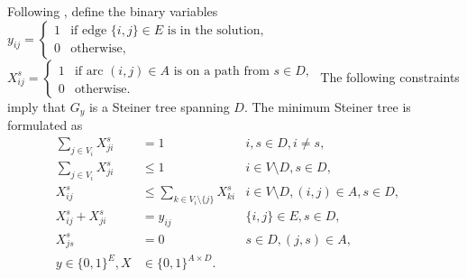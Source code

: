 Following \cite{Haugland12Dual}, define the binary variables
\newline\newline
$y_{ij}=
\begin{cases}
    1 & \text{if edge $\{i,j\} \in E$ is in the solution},\\
    0 & \text{otherwise},
  \end{cases}$
\newline\newline
$X^{s}_{ij}=
\begin{cases}
    1 & \text{if arc $(i,j) \in A$ is on a path from $s\in D$},\\
    0 & \text{otherwise}.
  \end{cases}$
\newline\newline
The following constraints imply that $G_y$ is a Steiner tree spanning $D$.
The minimum Steiner tree is formulated as
\begin{subequations}\label{mod:x0}
\begin{align}
\label{con:dd:arrowFromDest} \sum\limits_{j\in V_i}X^s_{ji} & = 1 & i,s\in D,i\neq s,\\
\label{con:dd:arrowFromNonDestB} \sum\limits_{j\in V_{i}}X^s_{ji} & \leq 1 & i\in V \setminus D, s\in D,\\
\label{con:dd:arrowFromNonDestA} X^s_{ij} & \leq \sum\limits_{k\in V_{i}\setminus \{j\}}X^s_{ki} & i\in V \setminus D,(i,j)\in A, s\in D,\\
\label{con:dd:oneDir} X^s_{ij} + X^s_{ji} & = y_{ij} & \{i,j\}\in E, s\in D,\\
\label{con:dd:startInSource} X^s_{js} & = 0 &  s\in D, (j,s)\in A,&\\
\label{con:dd:vardim}y \in \{0,1\}^{E}, X & \in \{0,1\}^{A\times D}.
\end{align}~
\end{subequations}

